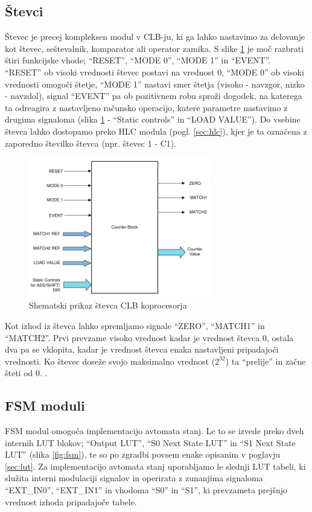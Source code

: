\documentclass[a4paper]{article}
\begin{document}
\begin{sloppypar}
\subsection{Števci}
Števec je precej kompleksen modul v CLB-ju, ki ga lahko nastavimo za delovanje
kot števec, seštevalnik, komparator ali operator zamika. S slike
\ref{fig:stevec} je moč razbrati štiri funkcijske vhode; ``RESET'', ``MODE 0'',
``MODE 1'' in ``EVENT''. ``RESET'' ob visoki vrednosti
števec postavi na vrednost 0, ``MODE 0'' ob visoki vrednosti omogoči štetje,
``MODE 1'' nastavi smer štetja (visoko - navzgor, nizko - navzdol), signal
``EVENT'' pa ob pozitivnem robu sproži dogodek, na katerega ta odreagira z
nastavljeno računsko operacijo, katere parametre nastavimo z drugima signaloma
(slika \ref{fig:stevec} - ``Static controls'' in ``LOAD VALUE''). Do vsebine
števca lahko dostopamo preko HLC modula (pogl. \ref{sec:hlc}), kjer je ta
označena z zaporedno številko števca (npr. števec 1 - C1).

\begin{figure}[htb]
    \centerline{\includegraphics[width=8cm]{shema_stevec}}
    \caption{Shematski prikaz števca CLB koprocesorja
             \cite[Pogl.~26.4.2.1]{mcu-ref-manual}}
    \label{fig:stevec} 
\end{figure} 

Kot izhod iz števca lahko spremljamo signale ``ZERO'', ``MATCH1'' in
``MATCH2''. Prvi prevzame visoko vrednost kadar je vrednost števca 0, ostala
dva pa se vklopita, kadar je vrednost števca enaka nastavljeni pripadajoči
vrednosti. Ko števec doseže svojo maksimalno vrednost ($2^{32}$) ta ``prelije''
in začne šteti od 0.
\cite[Pogl.~26.4.2]{mcu-ref-manual}.

\subsection{FSM moduli}
FSM modul omogoča implementacijo avtomata stanj. Le to se izvede preko dveh
internih LUT blokov; ``Output LUT'', ``S0 Next State LUT'' in ``S1 Next State
LUT'' (slika \ref{fig:fsm}), te so po zgradbi povsem enake opisanim v poglavju
\ref{sec:lut}. Za implementacijo avtomata stanj uporabljamo le slednji LUT
tabeli, ki služita interni modulaciji signalov in operirata z zunanjima
signaloma ``EXT\_IN0'', ``EXT\_IN1'' in vhodoma ``S0'' in ``S1'', ki prevzameta
prejšnjo vrednost izhoda pripadajoče tabele.


\end{sloppypar}
\end{document}
